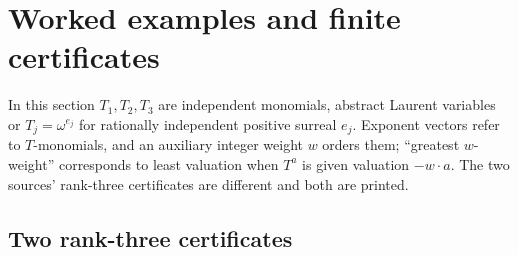 \documentclass[11pt,letterpaper]{article}
\numberwithin{equation}{section}
\theoremstyle{definition}
\theoremstyle{remark}
\begin{document}
\section{Worked examples and finite certificates}
\label{adr:sr:sec:examples}

In this section $T_1,T_2,T_3$ are independent monomials, abstract Laurent
variables or $T_j=\omega^{e_j}$ for rationally independent positive surreal
$e_j$. Exponent vectors refer to $T$-monomials, and an auxiliary integer weight
$w$ orders them; ``greatest $w$-weight'' corresponds to least valuation when
$T^a$ is given valuation $-w\cdot a$. The two sources' rank-three certificates
are different and both are printed.

\subsection{Two rank-three certificates}
\end{document}
